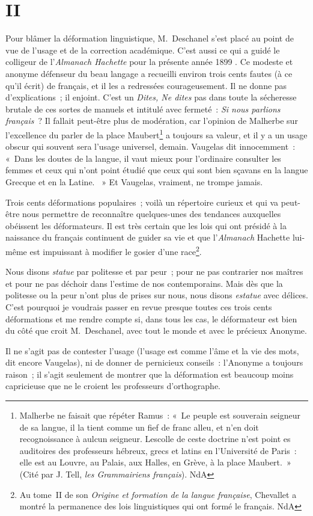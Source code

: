 \documentclass[french,twoside]{book} %
\begin{document}
\section[{II}]{II}
\noindent Pour blâmer la déformation linguistique, M. Deschanel s’est placé au point de vue de l’usage et de la correction académique. C’est aussi ce qui a guidé le colligeur de l’{\itshape Almanach Hachette} pour la présente année 1899 . Ce modeste et anonyme défenseur du beau langage a recueilli environ trois cents fautes (à ce qu’il écrit) de français, et il les a redressées courageusement. Il ne donne pas d’explications ; il enjoint. C’est un {\itshape Dites, Ne dites} pas dans toute la sécheresse brutale de ces sortes de manuels et intitulé avec fermeté : {\itshape Si nous parlions français} ? Il fallait peut-être plus de modération, car l’opinion de Malherbe sur l’excellence du parler de la place Maubert\footnote{Malherbe ne faisait que répéter Ramus : « Le peuple est souverain seigneur de sa langue, il la tient comme un fief de franc alleu, et n’en doit recognoissance à aulcun seigneur. Lescolle de ceste doctrine n’est point es auditoires des professeurs hébreux, grecs et latins en l’Université de Paris : elle est au Louvre, au Palais, aux Halles, en Grève, à la place Maubert. » (Cité par J. Tell, {\itshape les Grammairiens français}). NdA} a toujours sa valeur, et il y a un usage obscur qui souvent sera l’usage universel, demain. Vaugelas dit innocemment : « Dans les doutes de la langue, il vaut mieux pour l’ordinaire consulter les femmes et ceux qui n’ont point étudié que ceux qui sont bien sçavans en la langue Grecque et en la Latine.  » Et Vaugelas, vraiment, ne trompe jamais.\par
Trois cents déformations populaires ; voilà un répertoire curieux et qui va peut-être nous permettre de reconnaître quelques-unes des tendances auxquelles obéissent les déformateurs. Il est très certain que les lois qui ont présidé à la naissance du français continuent de guider sa vie et que l’{\itshape Almanach} Hachette lui-même est impuissant à modifier le gosier d’une race\footnote{ Au tome II de son {\itshape Origine et formation de la langue française}, Chevallet a montré la permanence des lois linguistiques qui ont formé le français. NdA}.\par
Nous disons {\itshape statue} par politesse et par peur ; pour ne pas contrarier nos maîtres et pour ne pas déchoir dans l’estime de nos contemporains. Mais dès que la politesse ou la peur n’ont plus de prises sur nous, nous disons {\itshape estatue} avec délices. C’est pourquoi je voudrais passer en revue presque toutes ces trois cents déformations et me rendre compte si, dans tous les cas, le déformateur est bien du côté que croit M. Deschanel, avec tout le monde et avec le précieux Anonyme.\par
Il ne s’agit pas de contester l’usage (l’usage est comme l’âme et la vie des mots, dit encore Vaugelas), ni de donner de pernicieux conseils : l’Anonyme a toujours raison ; il s’agit seulement de montrer que la déformation est beaucoup moins capricieuse que ne le croient les professeurs d’orthographe.\par
\end{document}
